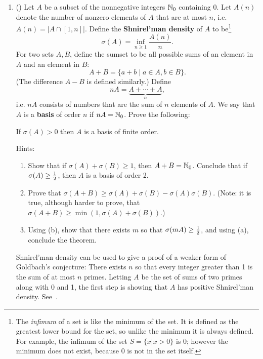 \begin{enumerate}
\item (\cite[\S 7.4]{Nat}) Let $A$ be a subset of the nonnegative integers $\mathbb{N}_0$ containing 0. Let $A(n)$ denote the number of nonzero elements of $A$ that are at most $n$, i.e. $A(n)=|A\cap [1,n]|$. Define the \textbf{Shnirel'man density} of $A$ to be{\footnote{The {\it infimum} of a set is like the minimum of the set. It is defined as the greatest lower bound for the set, so unlike the minimum it is always defined. For example, the infimum of the set $S=\{x|x>0\}$ is 0; however the minimum does not exist, because 0 is not in the set itself.}}
\[
\sigma(A)=\inf_{n\geq 1} \frac{A(n)}{n}.
\]
For two sets $A,B$, define the sumset to be all possible sums of an element in $A$ and an element in $B$:
\[
A+B=\{a+b\mid a\in A,b\in B\}.
\]
(The difference $A-B$ is defined similarly.) Define
\[
nA=\underbrace{A+\cdots +A}_n,
\]
i.e. $nA$ consists of numbers that are the sum of $n$ elements of $A$. We say that $A$ is a \textbf{basis} of order $n$ if $nA=\mathbb{N}_0$. 
Prove the following:
\begin{thm} 
If $\sigma(A)>0$ then $A$ is a basis of finite order.
\end{thm}
Hints:
\begin{enumerate}
\item
Show that if $\sigma(A)+\sigma(B)\geq 1$, then $A+B=\mathbb{N}_0$. Conclude that if $\sigma(A)\geq \frac{1}{2}$, then $A$ is a basis of order 2. 
\item 
Prove that $\sigma(A+B)\geq \sigma(A)+\sigma(B)-\sigma(A)\sigma(B)$. (Note: it is true, although harder to prove, that $\sigma(A+B)\geq \min(1,\sigma(A)+\sigma(B))$.)
\item Using (b), show that there exists $m$ so that $\sigma(mA)\geq \frac{1}{2}$, and using (a), conclude the theorem.
\end{enumerate}
Shnirel'man density can be used to give a proof of a weaker form of Goldbach's conjecture: There exists $n$ so that every integer greater than 1 is the sum of at most $n$ primes. Letting $A$ be the set of sums of two primes along with 0 and 1, the first step is showing that $A$ has positive Shnirel'man density. See~\cite[\S 7.5]{Nat}.
\end{enumerate}
\pagebreak
